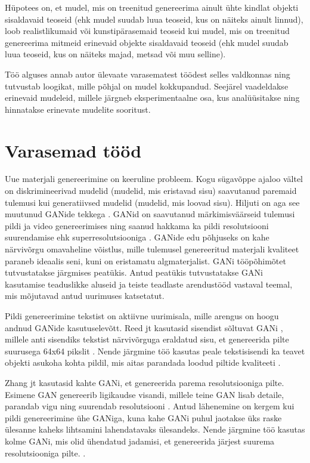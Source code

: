 \documentclass{vilgym}
\begin{document}
	Hüpotees on, et mudel, mis on treenitud genereerima ainult ühte kindlat objekti sisaldavaid teoseid (ehk mudel suudab luua teoseid, kus on näiteks ainult linnud), loob realistlikumaid või kunstipärasemaid teoseid kui mudel, mis on treenitud genereerima mitmeid erinevaid objekte sisaldavaid teoseid (ehk mudel suudab luua teoseid, kus on näiteks majad, metsad või muu selline).

	Töö alguses annab autor ülevaate varasematest töödest selles valdkonnas ning tutvustab loogikat, mille põhjal on mudel kokkupandud. Seejärel vaadeldakse erinevaid mudeleid, millele järgneb eksperimentaalne osa, kus analüüsitakse ning hinnatakse erinevate mudelite sooritust. 
	
	\section{Varasemad tööd}

	Uue materjali genereerimine on keeruline probleem. Kogu sügavõppe ajaloo vältel on diskrimineerivad mudelid (mudelid, mis eristavad sisu) saavutanud paremaid tulemusi kui generatiivsed mudelid (mudelid, mis loovad sisu). Hiljuti on aga see muutunud GANide tekkega \parencite{gan}. GANid on saavutanud märkimisväärseid tulemusi pildi \parencite{biggan} ja video genereerimises \parencite{dvdgan} ning saanud hakkama ka pildi resolutsiooni suurendamise ehk superresolutsiooniga \parencite{srgan}. GANide edu põhjuseks on kahe närvivõrgu omavaheline võistlus, mille tulemusel genereeritud materjali kvaliteet paraneb ideaalis seni, kuni on eristamatu algmaterjalist. GANi tööpõhimõtet tutvustatakse järgmises peatükis. Antud peatükis tutvustatakse GANi kasutamise teaduslikke aluseid ja teiste teadlaste arendustööd vastaval teemal, mis mõjutavad antud uurimuses katsetatut. 

	Pildi genereerimine tekstist on aktiivne uurimisala, mille arengus on hoogu andnud GANide kasutuselevõtt. Reed jt kasutasid sisendist sõltuvat GANi , millele anti sisendiks tekstist närvivõrguga eraldatud sisu, et genereerida pilte suurusega 64x64 pikslit \parencite{reed}. Nende järgmine töö kasutas peale tekstisisendi ka teavet objekti asukoha kohta pildil, mis aitas parandada loodud piltide kvaliteeti \parencite{reed2}. 

	Zhang jt kasutasid kahte GANi, et genereerida parema resolutsiooniga pilte. Esimene GAN genereerib ligikaudse visandi, millele teine GAN lisab detaile, parandab vigu ning suurendab resolutsiooni \parencite{stackgan}. Antud lähenemine on kergem kui pildi genereerimine ühe GANiga, kuna kahe GANi puhul jaotakse üks raske ülesanne kaheks lihtsamini lahendatavaks ülesandeks. Nende järgmine töö kasutas kolme GANi, mis olid ühendatud jadamisi, et genereerida järjest suurema resolutsiooniga pilte. \parencite{stackgan2}.
\end{document}
